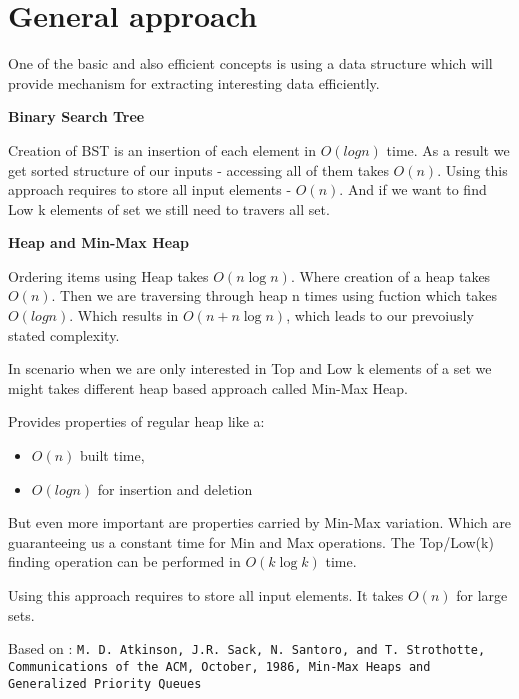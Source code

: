 \section*{General approach}
One of the basic and also efficient concepts is using a data structure which
will provide mechanism for extracting interesting data efficiently. 

\noindent \textbf{Binary Search Tree}

Creation of BST is an insertion of each element in $O(log{}n)$ time. As a result 
we get sorted structure of our inputs - accessing all of them takes $O(n)$.
Using this approach requires to store all input elements - $O(n)$. 
And if we want to find Low k elements of set we still need to travers all set.

\noindent \textbf{Heap and Min-Max Heap}

Ordering items using Heap takes $O(n\log{}n)$. Where creation of a heap takes
$O(n)$. Then we are traversing through heap n times using fuction which takes
$O(log{}n)$. Which results in $O(n + n\log{}n)$, which leads to our prevoiusly
stated complexity.

In scenario when we are only interested in Top and Low k elements of a set we might takes
different heap based approach called Min-Max Heap.

Provides properties of regular heap like a: 
\begin{itemize}
\item $O(n)$ built time,
\item $O(log{}n)$ for insertion and deletion
\end{itemize}

But even more important are properties carried by Min-Max variation. Which are 
guaranteeing us a constant time for Min and Max operations. The Top/Low(k) 
finding operation can be performed in $O(k\log{}k)$ time.

Using this approach requires to store all input elements. It takes $O(n)$ for 
large sets.

Based on : \texttt{M. D. Atkinson, J.R. Sack, N. Santoro, and T. Strothotte, 
Communications of the ACM, 
October, 1986, 
Min-Max Heaps and Generalized Priority Queues}